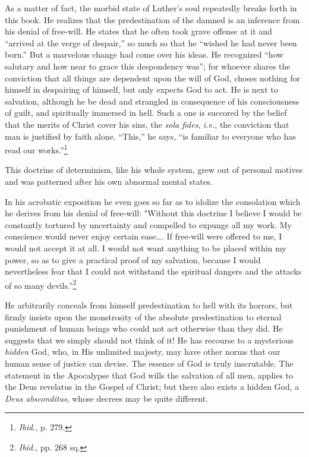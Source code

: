 As a matter of fact, the morbid state of Luther's soul repeatedly
breaks forth in this book. He realizes that the predestination of the
damned is an inference from his denial of free-will. He states that
he often took grave offense at it and ``arrived at the verge of despair,''
so much so that he ``wished he had never been born.'' But a marvelous
change had come over his ideas. He recognized ``how salutary and
how near to grace this despondency was''; for whoever shares the
conviction that all things are dependent upon the will of God, choses
nothing for himself in despairing of himself, but only expects God
to act. He is next to salvation, although he be dead and strangled in
consequence of his consciousness of guilt, and spiritually immersed in
hell. Such a one is succored by the belief that the merits of Christ
cover his sins, the \textit{sola fides}, \textit{i.e.}, the conviction that man is justified
by faith alone. ``This,'' he says, ``is familiar to everyone who has read
our works.''\footnote{\textit{Ibid.}, p. 279. }

This doctrine of determinism, like his whole system, grew out
of personal motives and was patterned after his own abnormal mental
states.

In his acrobatic exposition he even goes so far as to idolize the consolation
which he derives from his denial of free-will: "Without this doctrine I
believe I would be constantly tortured by uncertainty and compelled to
expunge all my work. My conscience would never enjoy certain ease\dots .
If free-will were offered to me, I would not accept it at all. I would not
want anything to be placed within my power, so as to give a practical proof
of my salvation, because I would nevertheless fear that I could not withstand
the spiritual dangers and the attacks of so many devils.”\footnote{\textit{Ibid.}, pp. 268 sq.}

He arbitrarily conceals from himself predestination to hell with its horrors,
but firmly insists upon the monstrosity of the absolute predestination to
eternal punishment of human beings who could not act otherwise than they
did. He suggests that we simply should not think of it! He has recourse to a
mysterious \textit{hidden} God, who, in His unlimited majesty, may have other
norms that our human sense of justice can devise. The essence of God is truly
inscrutable. The statement in the Apocalypse that God wills the salvation of
all men, applies to the Deus revelatus in the Gospel of Christ; but there
also exists a hidden God, a \textit{Deus absconditus}, whose decrees may be quite
different.

